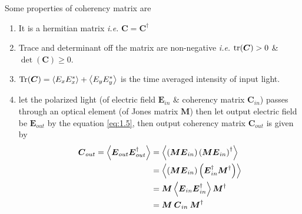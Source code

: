 \documentclass[11pt,a4paper]{article}
\numberwithin{equation}{section}
\begin{document}
Some properties of coherency matrix are
\begin{enumerate}
	\item It is a hermitian matrix \textit{i.e.} $\boldsymbol{C}=\boldsymbol{C}^\dagger$
	\item Trace and determinant off the matrix are non-negative \textit{i.e.} $\tr(\boldsymbol{C})>0$ \& $\det(\boldsymbol{C})\ge0$.
	\item $\Tr(\boldsymbol{C}) = \expval{E_x E_x^\ast} +\expval{E_y E_y^\ast}$ is the time averaged intensity of input light.
	\item let the polarized light (of electric field $\boldsymbol{E}_{in}$ \& coherency matrix $\boldsymbol{C}_{in}$) passes through an optical element (of Jones matrix $\boldsymbol{M}$) then let output electric field be $\boldsymbol{E}_{out}$ by the equation \ref{eq:1.5}, then output coherency matrix $\boldsymbol{C}_{out}$ is given by 
	\begin{align}
		\boldsymbol{C}_{out} = \expval{\boldsymbol{E}_{out}\boldsymbol{E}_{out}^\dagger} &= \expval{\left(\boldsymbol{M}\boldsymbol{E}_{in} \right) \left(\boldsymbol{M}\boldsymbol{E}_{in}\right)^\dagger}\nonumber\\
		&= \expval{\left(\boldsymbol{M}\boldsymbol{E}_{in} \right) \left(\boldsymbol{E}_{in}^\dagger\boldsymbol{M}^\dagger\right)}\nonumber \\
		&= \boldsymbol{M}\expval{\boldsymbol{E}_{in} \boldsymbol{E}_{in}^\dagger}\boldsymbol{M}^\dagger \nonumber\\
		&= \boldsymbol{M}\:\boldsymbol{C}_{in}\:\boldsymbol{M}^\dagger \label{eq:1.10}
	\end{align}
\end{enumerate}
\end{document}
